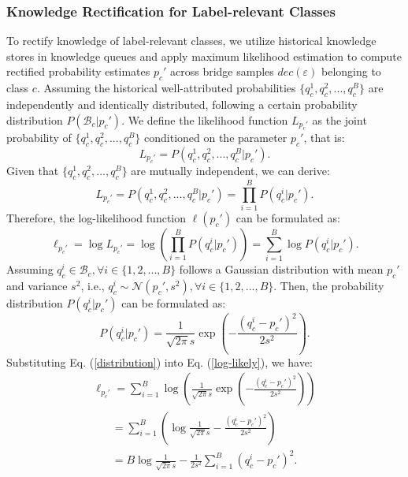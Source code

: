 \documentclass[10pt,journal]{IEEEtran}
\let\oldsum\sum
\renewcommand{\sum}{\displaystyle\oldsum}
\begin{document}
\subsubsection{Knowledge Rectification for Label-relevant Classes}
To rectify knowledge of label-relevant classes, we utilize historical knowledge stores in knowledge queues and apply maximum likelihood estimation to compute rectified probability estimates $p_c'$ across bridge samples $dec(\varepsilon)$ belonging to class $c$. Assuming the historical well-attributed probabilities $\{q_c^1, q_c^2, ..., q_c^B\}$ are independently and identically distributed, following a certain probability distribution $P(\mathcal{B}_c|p_c')$. We define the likelihood function $L_{p_c'}$ as the joint probability of $\{q_c^1, q_c^2, ..., q_c^B\}$ conditioned on the parameter $p_c'$, that is:
\begin{equation}
    L_{p_c'}=P(q_c^1,q_c^2,...,q_c^B|p_c').
\end{equation}
Given that $\{q_c^1, q_c^2, ..., q_c^B\}$ are mutually independent, we can derive:
\begin{equation}
    L_{p_c'} =P(q_c^1,q_c^2,...,q_c^B|p_c')= \prod_{i=1}^B P(q_c^i | p_c').
\end{equation}
Therefore, the log-likelihood function $\ell(p_c')$ can be formulated as:
\begin{equation}
    \ell_{p_c'} = \log L_{p_c'} = \log \left( \prod_{i=1}^B P(q_c^i | p_c') \right) = \sum_{i=1}^B \log P(q_c^i | p_c').
\end{equation}
Assuming $q_c^i \in \mathcal{B}_c, \forall i \in \{1, 2, ..., B\}$ follows a Gaussian distribution with mean $p_c'$ and variance $s^2$, i.e., $q_c^i \sim \mathcal{N}(p_c', s^2), \forall i \in \{1, 2, ..., B\}$. Then, the probability distribution $P(q_c^i | p_c')$ can be formulated as:
\begin{equation}
    P(q_c^i | p_c') = \frac{1}{\sqrt{2 \pi }s} \exp \left( -\frac{(q_c^i - p_c')^2}{2 s^2} \right).
    \label{distribution}
\end{equation}
Substituting Eq. (\ref{distribution}) into Eq. (\ref{log-likely}), we have:
\begin{equation}
\begin{array}{l}
\ell_{p_c'}
 = \sum\limits_{i = 1}^B {\log } \left( {\frac{1}{{\sqrt {2\pi } s}}\exp \left( { - \frac{{{{(q_c^i - {p_c'})}^2}}}{{2{s^2}}}} \right)} \right)\\
\;\;\;\; \; \; = \sum\limits_{i = 1}^B {\left( {\log \frac{1}{{\sqrt {2\pi } s}} - \frac{{{{(q_c^i - {p_c'})}^2}}}{{2{s^2}}}} \right)} \\
 \;\;\;\; \; \;  = B\log \frac{1}{{\sqrt {2\pi } s}} - \frac{1}{{2{s^2}}}\sum\limits_{i = 1}^B {{{(q_c^i - {p_c'})}^2}}.
\end{array}
 \label{log-likely}
\end{equation}
\end{document}
